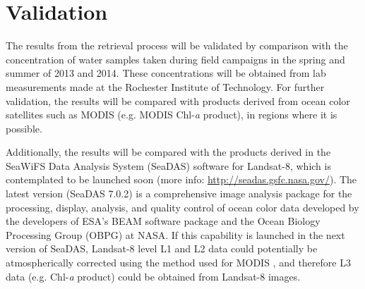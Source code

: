 \section{Validation}
The results from the retrieval process will be validated by comparison with the concentration of water samples taken during field campaigns in the spring and summer of 2013 and 2014. These concentrations will be obtained from lab measurements made at the Rochester Institute of Technology. For further validation, the results will be compared with products derived from ocean color satellites such as MODIS (e.g. MODIS Chl-{\it a} product), in regions where it is possible. 

Additionally, the results will be compared with the products derived in the SeaWiFS Data Analysis System (SeaDAS) software for Landsat-8, which is contemplated to be launched soon (more info: \url{http://seadas.gsfc.nasa.gov/}). The latest version (SeaDAS 7.0.2) is a comprehensive image analysis package for the processing, display, analysis, and quality control of ocean color data developed by the developers of ESA's BEAM software package and the Ocean Biology Processing Group (OBPG) at NASA. If this capability is launched in the next version of SeaDAS, Landsat-8 level L1 and L2 data could potentially be  atmospherically corrected using the method used for MODIS \cite{Gordon:1994,Ruddick:2000bs,Wang:2007dz}, and therefore L3 data (e.g. Chl-{\it a} product) could be obtained from Landsat-8 images.




